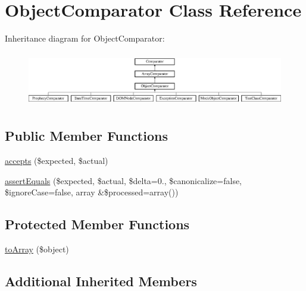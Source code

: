 \hypertarget{class_sebastian_bergmann_1_1_comparator_1_1_object_comparator}{}\section{Object\+Comparator Class Reference}
\label{class_sebastian_bergmann_1_1_comparator_1_1_object_comparator}
Inheritance diagram for Object\+Comparator\+:\begin{figure}[H]
\begin{center}
\leavevmode
\includegraphics[height=2.424242cm]{class_sebastian_bergmann_1_1_comparator_1_1_object_comparator}
\end{center}
\end{figure}
\subsection*{Public Member Functions}
\begin{DoxyCompactItemize}
\item 
\mbox{\hyperlink{class_sebastian_bergmann_1_1_comparator_1_1_object_comparator_ae9bdf0cba02ce3470169280656cdeb84}{accepts}} (\$expected, \$actual)
\item 
\mbox{\hyperlink{class_sebastian_bergmann_1_1_comparator_1_1_object_comparator_a85a7369896910cf1d55e31d477c29f1e}{assert\+Equals}} (\$expected, \$actual, \$delta=0., \$canonicalize=false, \$ignore\+Case=false, array \&\$processed=array())
\end{DoxyCompactItemize}
\subsection*{Protected Member Functions}
\begin{DoxyCompactItemize}
\item 
\mbox{\hyperlink{class_sebastian_bergmann_1_1_comparator_1_1_object_comparator_afd1cb3de15bd99be95ad5c707a97c493}{to\+Array}} (\$object)
\end{DoxyCompactItemize}
\subsection*{Additional Inherited Members}


